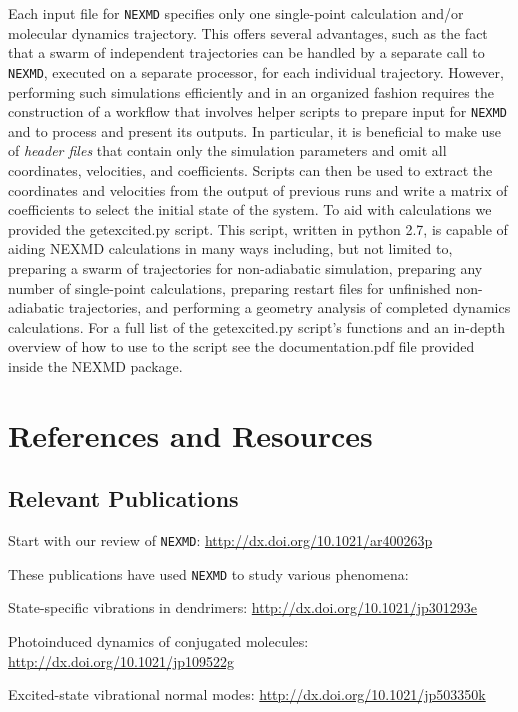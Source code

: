 \documentclass[12pt,letter,footinclude=true,headinclude=true,hyphens,oneside]{book} %
\begin{document}
    Each input file for \texttt{NEXMD} specifies only one single-point calculation and/or molecular dynamics trajectory. This offers several advantages, such as the fact that a swarm of independent trajectories can be handled by a separate call to \texttt{NEXMD}, executed on a separate processor, for each individual trajectory. However, performing such simulations efficiently and in an organized fashion requires the construction of a workflow that involves helper scripts to prepare input for \texttt{NEXMD} and to process and present its outputs. In particular, it is beneficial to make use of \emph{header files} that contain only the simulation parameters and omit all coordinates, velocities, and coefficients. Scripts can then be used to extract the coordinates and velocities from the output of previous runs and write a matrix of coefficients to select the initial state of the system.  To aid with calculations we provided the getexcited.py script.  This script, written in python 2.7, is capable of aiding NEXMD calculations in many ways including, but not limited to, preparing a swarm of trajectories for non-adiabatic simulation, preparing any number of single-point calculations, preparing restart files for unfinished non-adiabatic trajectories, and performing a geometry analysis of completed dynamics calculations.  For a full list of the getexcited.py script's functions and an in-depth overview of how to use to the script see the documentation.pdf file provided inside the NEXMD package.
    
    \chapter{References and Resources}

    \section{Relevant Publications}
    
    Start with our review of \texttt{NEXMD}: \url{http://dx.doi.org/10.1021/ar400263p}
    
    \noindent These publications have used \texttt{NEXMD} to study various phenomena:
    
    State-specific vibrations in dendrimers: \url{http://dx.doi.org/10.1021/jp301293e}
    
    
    Photoinduced dynamics of conjugated molecules: \url{http://dx.doi.org/10.1021/jp109522g}
    
    
    Excited-state vibrational normal modes: \url{http://dx.doi.org/10.1021/jp503350k}
    
\end{document}
